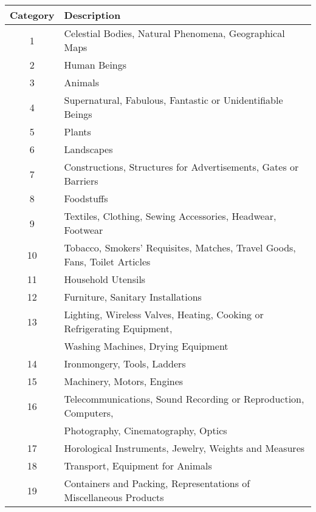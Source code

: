 \documentclass{article}
\begin{document}
\begin{table}[]
\centering
\begin{tabular}{|c|l|}
\hline
\textbf{Category} & \textbf{Description}                                            \\ \hline
1        & Celestial Bodies, Natural Phenomena, Geographical Maps          \\ \hline
2        & Human Beings                                                    \\ \hline
3        & Animals                                                         \\ \hline
4        & Supernatural, Fabulous, Fantastic or Unidentifiable Beings      \\ \hline
5        & Plants                                                          \\ \hline
6        & Landscapes                                                      \\ \hline
7        & Constructions, Structures for Advertisements, Gates or Barriers \\ \hline
8        & Foodstuffs                                                      \\ \hline
9        & Textiles, Clothing, Sewing Accessories, Headwear, Footwear      \\ \hline
10        & Tobacco, Smokers’ Requisites, Matches, Travel Goods, Fans, Toilet Articles      \\ \hline
11        & Household Utensils      \\ \hline
12        & Furniture, Sanitary Installations      \\ \hline
13        & Lighting, Wireless Valves, Heating, Cooking or Refrigerating Equipment,\\
        &  Washing Machines, Drying Equipment      \\ \hline
14        & Ironmongery, Tools, Ladders      \\ \hline
15        & Machinery, Motors, Engines      \\ \hline
16        & Telecommunications, Sound Recording or Reproduction, Computers, \\
        &  Photography, Cinematography, Optics      \\ \hline
17        & Horological Instruments, Jewelry, Weights and Measures      \\ \hline
18        & Transport, Equipment for Animals      \\ \hline
19        & Containers and Packing, Representations of Miscellaneous Products      \\ \hline

\end{tabular}
\end{table}
\end{document}
